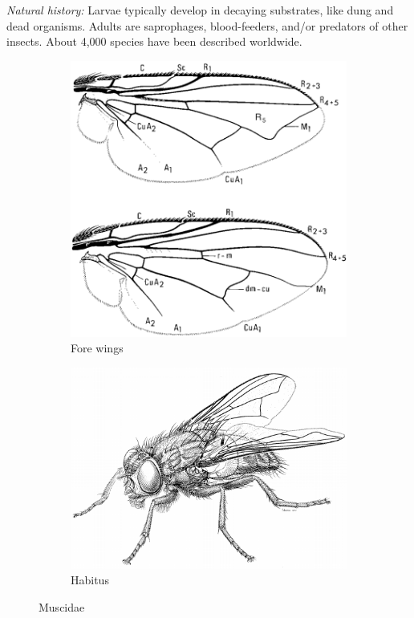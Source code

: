 \documentclass[letterpaper, 11pt]{article}
\begin{document}
\noindent{}\textit{Natural history:} Larvae typically develop in decaying substrates, like dung and dead organisms. Adults are saprophages, blood-feeders, and/or predators of other insects. About 4,000 species have been described worldwide.

\begin{figure}[ht!]
    \centering
    \begin{subfigure}[ht!]{0.4\textwidth}
        \includegraphics[width=\textwidth]{MuscidWings}
        \caption{Fore wings \citep[][Fig. 105.22,24]{mcalpine1981manualv2}}
        \label{fig:muscid1}
    \end{subfigure}
    \qquad
    \begin{subfigure}[ht!]{0.45\textwidth}
        \includegraphics[width=\textwidth]{MuscidHabitus}
        \caption{Habitus \citep[][Fig. 105.1]{mcalpine1981manualv2}}
        \label{fig:muscid2}
    \end{subfigure}
    \caption{Muscidae}\label{fig:muscids}
\end{figure}
\end{document}
